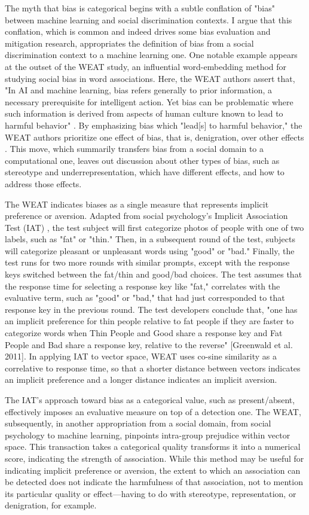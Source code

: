 \documentclass[11pt]{article}
\begin{document}
The myth that bias is categorical begins with a subtle conflation
of "bias" between machine learning and social discrimination 
contexts. I argue that this conflation, which is common and indeed drives some bias
evaluation and mitigation research, appropriates the definition of bias from a social discrimination context to a machine learning one. One notable example 
appears at the outset of the WEAT study, an influential word-embedding
method for studying social bias in word associations.  Here, the WEAT authors
assert that, "In AI and machine learning, bias refers generally to
prior information, a necessary prerequisite for intelligent action.
Yet bias can be problematic where such information is derived from
aspects of human culture known to lead to harmful
behavior" \citep{caliskan:2017}. By emphasizing bias which "lead[s] to harmful behavior,"
the WEAT authors prioritize one effect of bias, that is, denigration, over other effects \citep{caliskan:2017}. This move, which summarily transfers
bias from a social domain to a computational one, leaves out discussion about other types of bias, such as stereotype
and underrepresentation, which have different effects, and how to address those effects.

The WEAT indicates biases as a single measure that represents implicit preference or aversion. Adapted from social psychology's Implicit Association Test (IAT) \citep{greenwald:1998}, the test subject
will first categorize photos of people with one of two labels, such as "fat"
or "thin." Then, in a subsequent round of the test, subjects will
categorize pleasant or unpleasant words using "good" or "bad."
Finally, the test runs for two more rounds with similar prompts, except with the response keys switched between
the fat/thin and good/bad choices. The test assumes that the response
time for selecting a response key like "fat," correlates with the
evaluative term, such as "good" or "bad," that had just corresponded
to that response key in the previous round. The test developers
conclude that, "one has an implicit preference for thin people
relative to fat people if they are faster to categorize words when
Thin People and Good share a response key and Fat People and Bad share
a response key, relative to the reverse" [Greenwald et al. 2011]. In
applying IAT to vector space, WEAT uses co-sine similarity as a
correlative to response time, so that a shorter distance between
vectors indicates an implicit preference and a longer distance
indicates an implicit aversion.

The IAT's approach toward bias as a categorical value, such as
present/absent, effectively imposes an evaluative measure on top of a
detection one. The WEAT, subsequently, in another appropriation from a social domain,
from social psychology to machine learning,
pinpoints intra-group prejudice within vector space. This transaction takes a categorical quality
transforms it into a numerical score, indicating the strength of association. While this method
may be useful for indicating implicit preference or aversion, the extent to which
an association can be detected does not indicate the harmfulness of that association, not to mention
its particular quality or effect---having to do with stereotype,
representation, or denigration, for example.
\end{document}
